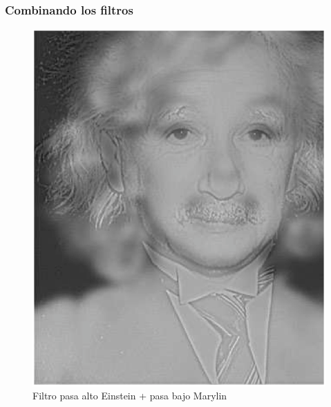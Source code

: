 \begin{frame}
\frametitle{Combinando los filtros}
\begin{figure}
    \centering
    \includegraphics[scale=0.22]{Imagenes/Einstein_Marylin_AB_01.eps}
    \caption{Filtro pasa alto Einstein + pasa bajo Marylin}
\end{figure}
\end{frame}
